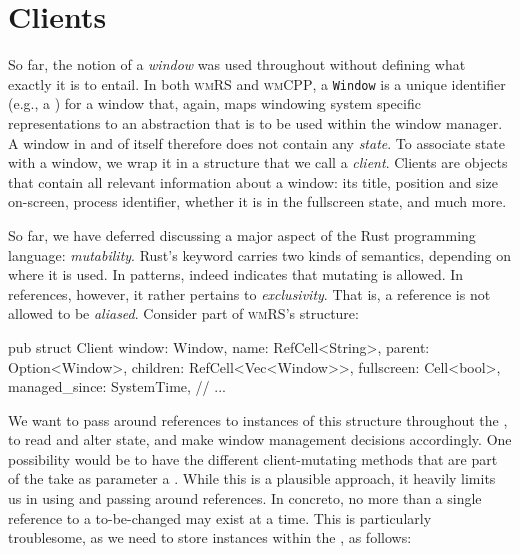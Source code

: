 \section{Clients}

So far, the notion of a \textit{window} was used throughout without defining
what exactly it is to entail. In both \textsc{wmRS} and \textsc{wmCPP}, a
\texttt{Window} is a unique identifier (e.g., a ) for a window that,
again, maps windowing system specific representations to an abstraction that is
to be used within the window manager. A window in and of itself therefore does
not contain any \textit{state}. To associate state with a window, we wrap it in
a structure that we call a \textit{client}. Clients are objects that contain all
relevant information about a window: its title, position and size on-screen,
process identifier, whether it is in the fullscreen state, and much more.


So far, we have deferred discussing a major aspect of the Rust programming
language: \textit{mutability}. Rust's  keyword carries two kinds
of semantics, depending on where it is used. In patterns,  indeed
indicates that mutating is allowed. In references, however, it rather pertains
to \textit{exclusivity}. That is, a  reference is not allowed to be
\textit{aliased}. Consider part of \textsc{wmRS}'s  structure:

\begin{rustblock}
  pub struct Client {
    window: Window,
    name: RefCell<String>,
    parent: Option<Window>,
    children: RefCell<Vec<Window>>,
    fullscreen: Cell<bool>,
    managed_since: SystemTime,
    // ...
  }
\end{rustblock}

We want to pass around references to instances of this structure throughout
the , to read and alter state, and make window management
decisions accordingly. One possibility would be to have the different
client-mutating methods that are part of the  take as parameter
a . While this is a plausible approach, it heavily limits
us in using and passing around references. In concreto, no more than a single
reference to a to-be-changed  may exist at a time. This is
particularly troublesome, as we need to store  instances within the
, as follows:

